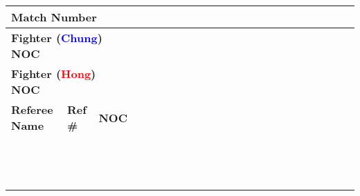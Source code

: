 \documentclass[letterpaper,12pt]{article}
\begin{document}
	
	
	\centering
	\footnotesize %
	\setlength\doublerulesep{0.5cm} 
	\begin{tabular}{|p{4.5cm}|p{1.1cm}|p{1.1cm}
			|p{0.5cm}|p{0.5cm}|p{0.5cm}|p{0.5cm}|p{0.5cm}|p{0.5cm}|p{0.5cm}|p{0.5cm}|p{0.5cm}|p{0.5cm}|p{0.5cm}|p{0.5cm}|p{0.5cm}|p{0.5cm}|p{0.5cm}|p{0.5cm}|p{0.5cm}|p{0.5cm}|p{0.5cm}|p{0.5cm}|}
		\hline
		\multicolumn{3}{|l|}{\textbf{Match Number}} & & & & & & & & & & & & & & & & & & & & \\
		\hline
		\multicolumn{3}{|l|}{\textbf{Fighter (\textcolor{blue}{Chung}) NOC}} & & & & & & & & & & & & & & & & & & & & \\
		\hline
		\multicolumn{3}{|l|}{\textbf{Fighter (\textcolor{red}{Hong}) NOC}} & & & & & & & & & & & & & & & & & & & & \\
		\hline
		\hline
		\textbf{Referee Name} & \textbf{Ref \#} & \textbf{NOC} & & & & & & & & & & & & & & & & & & & & \\
		\hline
		& & & & & & & & & & & & & & & & & & & & & & \\
		\hline
		& & & & & & & & & & & & & & & & & & & & & & \\
		\hline
		& & & & & & & & & & & & & & & & & & & & & & \\
		\hline
		& & & & & & & & & & & & & & & & & & & & & & \\
		\hline
		& & & & & & & & & & & & & & & & & & & & & & \\
		\hline
		& & & & & & & & & & & & & & & & & & & & & & \\
		\hline
		& & & & & & & & & & & & & & & & & & & & & & \\
		\hline
		& & & & & & & & & & & & & & & & & & & & & & \\
		\hline
		& & & & & & & & & & & & & & & & & & & & & & \\
		\hline
		& & & & & & & & & & & & & & & & & & & & & & \\
		\hline
		& & & & & & & & & & & & & & & & & & & & & & \\
		\hline
		& & & & & & & & & & & & & & & & & & & & & & \\
		\hline
		& & & & & & & & & & & & & & & & & & & & & & \\
		\hline

	\end{tabular}
	
\end{document}
